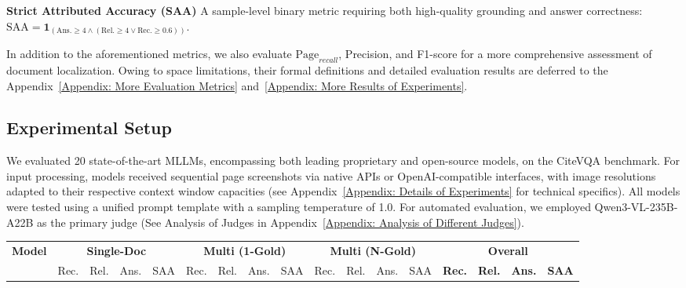 \documentclass{llmxive}
\providecommand{\arraystretch}{1.1}
\begin{document}
{\textbf{Strict Attributed Accuracy (SAA)} A sample-level binary metric requiring both high-quality grounding and answer correctness: $\text{SAA} = \mathbf{1}_{(\text{Ans.} \ge 4 \land (\text{Rel.} \ge 4 \lor \text{Rec.} \ge 0.6))}$.

In addition to the aforementioned metrics, we also evaluate $\text{Page}_{recall}$, Precision, and F1-score for a more comprehensive assessment of document localization. Owing to space limitations, their formal definitions and detailed evaluation results are deferred to the Appendix~\ref{Appendix: More Evaluation Metrics} and~\ref{Appendix: More Results of Experiments}.

\subsection{Experimental Setup}
\label{Experimental Setup}
We evaluated 20 state-of-the-art MLLMs, encompassing both leading proprietary and open-source models, on the CiteVQA benchmark. For input processing, models received sequential page screenshots via native APIs or OpenAI-compatible interfaces, with image resolutions adapted to their respective context window capacities (see Appendix~\ref{Appendix: Details of Experiments} for technical specifics). All models were tested using a unified prompt template with a sampling temperature of 1.0. For automated evaluation, we employed Qwen3-VL-235B-A22B as the primary judge (See Analysis of Judges in Appendix~\ref{Appendix: Analysis of Different Judges}).


\begin{table}[t]
\centering
\scriptsize
\renewcommand{\arraystretch}{1.25}
\setlength{\tabcolsep}{1.0pt}
\begin{tabular}{@{}l cccc cccc cccc >{\bfseries}c>{\bfseries}c>{\bfseries}c>{\bfseries}c@{}}
\toprule
\multirow{2.5}{*}{\textbf{Model}} & \multicolumn{4}{c}{\textbf{Single-Doc}} & \multicolumn{4}{c}{\textbf{Multi (1-Gold)}} & \multicolumn{4}{c}{\textbf{Multi (N-Gold)}} & \multicolumn{4}{c}{\textbf{Overall}} \\
\cmidrule(lr){2-5} \cmidrule(lr){6-9} \cmidrule(lr){10-13} \cmidrule(l){14-17}
& Rec. & Rel. & Ans. & SAA & Rec. & Rel. & Ans. & SAA & Rec. & Rel. & Ans. & SAA & Rec. & Rel. & Ans. & SAA \\ \midrule


\end{tabular}
\end{table}}
\end{document}
